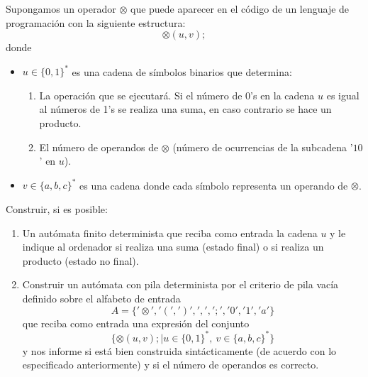 \begin{ejercicio}\label{ej:1.5.24}
    Supongamos un operador $\otimes$ que puede aparecer en el código de un lenguaje de programación con la siguiente estructura:
    \begin{equation*}
        \otimes(u,v);
    \end{equation*}
    donde
    \begin{itemize}
        \item $u\in {\{0,1\}}^{\ast}$ es una cadena de símbolos binarios que determina:
            \begin{enumerate}
                \item La operación que se ejecutará. Si el número de 0's en la cadena $u$ es igual al números de 1's se realiza una suma, en caso contrario se hace un producto.
                \item El número de operandos de $\otimes$ (número de ocurrencias de la subcadena '$10$' en $u$).
            \end{enumerate}
        \item $v\in {\{a,b,c\}}^{\ast}$ es una cadena donde cada símbolo representa un operando de $\otimes$.
    \end{itemize}
    Construir, si es posible:
    \begin{enumerate}
        \item Un autómata finito determinista que reciba como entrada la cadena $u$ y le indique al ordenador si realiza una suma (estado final) o si realiza un producto (estado no final).
        \item Construir un autómata con pila determinista por el criterio de pila vacía definido sobre el alfabeto de entrada
            \begin{equation*}
                A = \{'\otimes', '(', ')', ',', ';', '0', '1', 'a'\}
            \end{equation*}
            que reciba como entrada una expresión del conjunto
            \begin{equation*}
                \{\otimes(u,v); \mid u\in {\{0,1\}}^{\ast},\ v\in {\{a,b,c\}}^{\ast}\}
            \end{equation*}
            y nos informe si está bien construida sintácticamente (de acuerdo con lo especificado anteriormente) y si el número de operandos es correcto.
    \end{enumerate}

\end{ejercicio}

